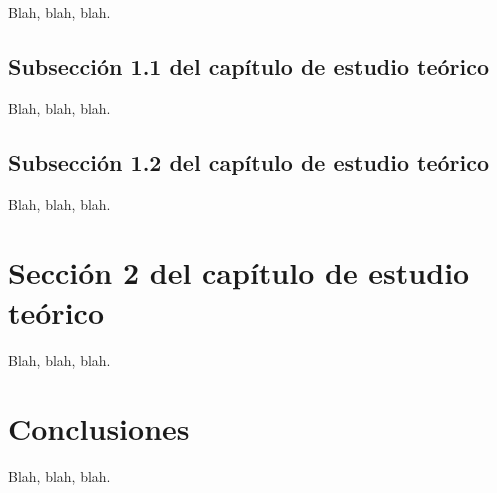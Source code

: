 Blah, blah, blah.


\subsection{Subsección 1.1 del capítulo de estudio teórico}
\label{sec:theory-11}

Blah, blah, blah.


\subsection{Subsección 1.2 del capítulo de estudio teórico}
\label{sec:theory-12}

Blah, blah, blah.


\section{Sección 2 del capítulo de estudio teórico}
\label{sec:theory-2}

Blah, blah, blah.




\section{Conclusiones}
\label{sec:theory-conclusions}

Blah, blah, blah.


